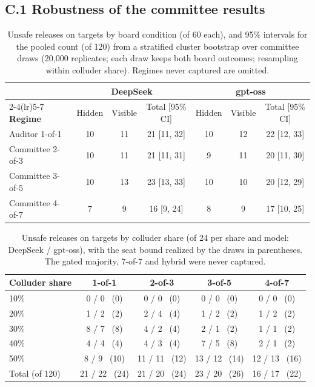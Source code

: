 \documentclass[11pt, letterpaper]{article}
\begin{document}
\subsection*{C.1 Robustness of the committee results}

\begin{table}[H]
  \centering\small
  \renewcommand{\arraystretch}{1.1}
  \caption{Unsafe releases on targets by board condition (of 60 each), and 95\%
    intervals for the pooled count (of 120) from a stratified cluster bootstrap
    over committee draws (20,000 replicates; each draw keeps both board outcomes;
    resampling within colluder share). Regimes never captured are omitted.}
  \label{tab:robust}
  \begin{tabular}{@{}l ccc ccc@{}}
    \toprule
    & \multicolumn{3}{c}{\textbf{DeepSeek}} & \multicolumn{3}{c}{\textbf{gpt-oss}} \\
    \cmidrule(lr){2-4}\cmidrule(lr){5-7}
    \textbf{Regime} & Hidden & Visible & Total [95\% CI] & Hidden & Visible & Total [95\% CI] \\
    \midrule
    Auditor 1-of-1   & 10 & 11 & 21 [11, 32] & 10 & 12 & 22 [12, 33] \\
    Committee 2-of-3 & 10 & 11 & 21 [11, 31] &  9 & 11 & 20 [11, 30] \\
    Committee 3-of-5 & 10 & 13 & 23 [13, 33] & 10 & 10 & 20 [12, 29] \\
    Committee 4-of-7 &  7 &  9 & 16 [9, 24]  &  8 &  9 & 17 [10, 25] \\
    \bottomrule
  \end{tabular}
\end{table}

\begin{table}[H]
  \centering\small
  \renewcommand{\arraystretch}{1.1}
  \caption{Unsafe releases on targets by colluder share (of 24 per share and
    model: DeepSeek / gpt-oss), with the seat bound realized by the draws in
    parentheses. The gated majority, 7-of-7 and hybrid were never captured.}
  \label{tab:byshare}
  \begin{tabular}{@{}lcccc@{}}
    \toprule
    \textbf{Colluder share} & \textbf{1-of-1} & \textbf{2-of-3} & \textbf{3-of-5} & \textbf{4-of-7} \\
    \midrule
    10\% & 0 / 0 \ (0)  & 0 / 0 \ (0)    & 0 / 0 \ (0)    & 0 / 0 \ (0) \\
    20\% & 1 / 2 \ (2)  & 2 / 4 \ (4)    & 1 / 2 \ (2)    & 1 / 2 \ (2) \\
    30\% & 8 / 7 \ (8)  & 4 / 2 \ (4)    & 2 / 1 \ (2)    & 1 / 1 \ (2) \\
    40\% & 4 / 4 \ (4)  & 4 / 3 \ (4)    & 7 / 5 \ (8)    & 2 / 1 \ (2) \\
    50\% & 8 / 9 \ (10) & 11 / 11 \ (12) & 13 / 12 \ (14) & 12 / 13 \ (16) \\
    \midrule
    Total (of 120) & 21 / 22 \ (24) & 21 / 20 \ (24) & 23 / 20 \ (26) & 16 / 17 \ (22) \\
    \bottomrule
  \end{tabular}
\end{table}
\end{document}
